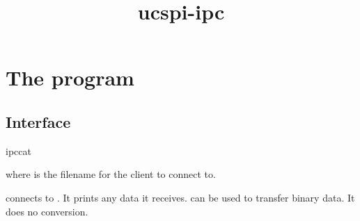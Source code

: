 \documentclass{book}
\title{ucspi-ipc}
\begin{document}
\section{The  program}

\subsection{Interface}
\begin{code}%
  ipccat 
\end{code}
where  is the filename for the client to connect to.

 connects to .  It prints any data it receives.
 can be used to transfer binary data.  It does no
conversion.
\end{document}
